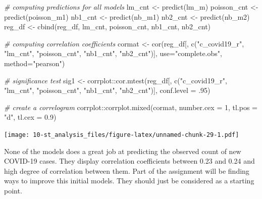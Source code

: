 \documentclass[
]{book}
\newenvironment{Shaded}{\begin{snugshade}}{\end{snugshade}}
\newcommand{\AttributeTok}[1]{\textcolor[rgb]{0.77,0.63,0.00}{#1}}
\newcommand{\CommentTok}[1]{\textcolor[rgb]{0.56,0.35,0.01}{\textit{#1}}}
\newcommand{\DecValTok}[1]{\textcolor[rgb]{0.00,0.00,0.81}{#1}}
\newcommand{\FloatTok}[1]{\textcolor[rgb]{0.00,0.00,0.81}{#1}}
\newcommand{\FunctionTok}[1]{\textcolor[rgb]{0.00,0.00,0.00}{#1}}
\newcommand{\NormalTok}[1]{#1}
\newcommand{\OtherTok}[1]{\textcolor[rgb]{0.56,0.35,0.01}{#1}}
\newcommand{\SpecialCharTok}[1]{\textcolor[rgb]{0.00,0.00,0.00}{#1}}
\newcommand{\StringTok}[1]{\textcolor[rgb]{0.31,0.60,0.02}{#1}}
\begin{document}
\begin{Shaded}
\begin{Highlighting}[]
\CommentTok{\# computing predictions for all models}
\NormalTok{lm\_cnt }\OtherTok{\textless{}{-}} \FunctionTok{predict}\NormalTok{(lm\_m)}
\NormalTok{poisson\_cnt }\OtherTok{\textless{}{-}} \FunctionTok{predict}\NormalTok{(poisson\_m1)}
\NormalTok{nb1\_cnt }\OtherTok{\textless{}{-}} \FunctionTok{predict}\NormalTok{(nb\_m1)}
\NormalTok{nb2\_cnt }\OtherTok{\textless{}{-}} \FunctionTok{predict}\NormalTok{(nb\_m2)}
\NormalTok{reg\_df }\OtherTok{\textless{}{-}} \FunctionTok{cbind}\NormalTok{(reg\_df, lm\_cnt, poisson\_cnt, nb1\_cnt, nb2\_cnt)}

\CommentTok{\# computing correlation coefficients}
\NormalTok{cormat }\OtherTok{\textless{}{-}} \FunctionTok{cor}\NormalTok{(reg\_df[, }\FunctionTok{c}\NormalTok{(}\StringTok{"c\_covid19\_r"}\NormalTok{, }\StringTok{"lm\_cnt"}\NormalTok{, }\StringTok{"poisson\_cnt"}\NormalTok{, }\StringTok{"nb1\_cnt"}\NormalTok{, }\StringTok{"nb2\_cnt"}\NormalTok{)], }
              \AttributeTok{use=}\StringTok{"complete.obs"}\NormalTok{, }
              \AttributeTok{method=}\StringTok{"pearson"}\NormalTok{)}

\CommentTok{\# significance test}
\NormalTok{sig1 }\OtherTok{\textless{}{-}}\NormalTok{ corrplot}\SpecialCharTok{::}\FunctionTok{cor.mtest}\NormalTok{(reg\_df[, }\FunctionTok{c}\NormalTok{(}\StringTok{"c\_covid19\_r"}\NormalTok{, }\StringTok{"lm\_cnt"}\NormalTok{, }\StringTok{"poisson\_cnt"}\NormalTok{, }\StringTok{"nb1\_cnt"}\NormalTok{, }\StringTok{"nb2\_cnt"}\NormalTok{)],}
                            \AttributeTok{conf.level =}\NormalTok{ .}\DecValTok{95}\NormalTok{)}

\CommentTok{\# create a correlogram}
\NormalTok{corrplot}\SpecialCharTok{::}\FunctionTok{corrplot.mixed}\NormalTok{(cormat,}
                         \AttributeTok{number.cex =} \DecValTok{1}\NormalTok{,}
                         \AttributeTok{tl.pos =} \StringTok{"d"}\NormalTok{,}
                         \AttributeTok{tl.cex =} \FloatTok{0.9}\NormalTok{)}
\end{Highlighting}
\end{Shaded}

\texttt{[image: 10-st\_analysis\_files/figure-latex/unnamed-chunk-29-1.pdf]}

None of the models does a great job at predicting the observed count of new COVID-19 cases. They display correlation coefficients between 0.23 and 0.24 and high degree of correlation between them. Part of the assignment will be finding ways to improve this initial models. They should just be considered as a starting point.
\end{document}
